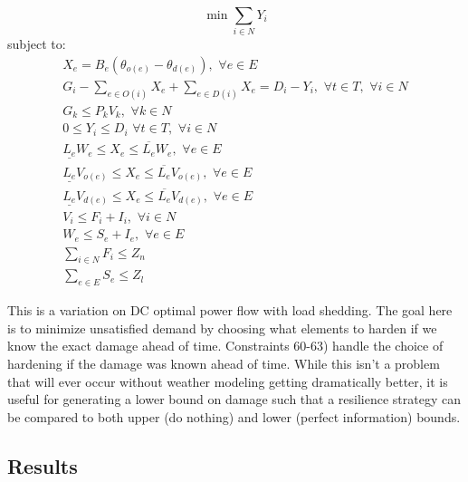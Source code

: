 \documentclass{article}
\begin{document}
		\begin{equation}
	\min \sum_{i \in N}  Y_i
	\end{equation}
	subject to:
	\begin{eqnarray}
	X_e = B_e (\theta_{o(e)} - \theta_{d(e)}),  \hspace{4pt} \forall e \in E\\
	G_i - \sum_{e \in O(i)} X_e + \sum_{e \in D(i)} X_e = D_i-Y_i, \hspace{4pt} \forall t \in T, \hspace{4pt} \forall i \in N\\
	G_k \leq P_{k} V_{k}, \hspace{4pt} \forall k \in N\\
	0\leq Y_i \leq D_i \hspace{4pt} \forall t \in T, \hspace{4pt} \forall i \in N\\
	\underline{L_e}W_{e} \leq X_{e} \leq \overline{L_e}W_{e}, \hspace{4pt} \forall e \in E\\
	\underline{L_e}V_{o(e)} \leq X_{e} \leq \overline{L_e}V_{o(e)},  \hspace{4pt} \forall e \in E\\
	\underline{L_e}V_{d(e)} \leq X_{e} \leq \overline{L_e}V_{d(e)}, \hspace{4pt} \forall e \in E\\
	V_i \leq F_i+I_i, \hspace{4pt} \forall i \in N\\
	W_{e} \leq  S_{e}+I_e, \hspace{4pt} \forall e \in E\\
	\sum_{i \in N} F_i \leq Z_n\\
	\sum_{e \in E} S_{e} \leq Z_l
	\end{eqnarray}
	
	This is a variation on DC optimal power flow with load shedding. The goal here is to minimize unsatisfied demand by choosing what elements to harden if we know the exact damage ahead of time. Constraints 60-63) handle the choice of hardening if the damage was known ahead of time. While this isn't a problem that will ever occur without weather modeling getting dramatically better, it is useful for generating a lower bound on damage such that a resilience strategy can be compared to both upper (do nothing) and lower (perfect information) bounds.
	
\subsection{Results}
\end{document}
